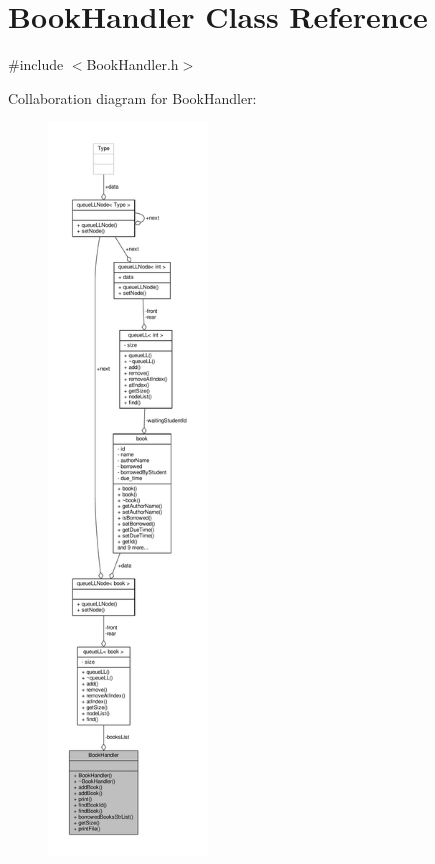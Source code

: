\hypertarget{class_book_handler}{}\section{Book\+Handler Class Reference}
\label{class_book_handler}


{\ttfamily \#include $<$Book\+Handler.\+h$>$}



Collaboration diagram for Book\+Handler\+:
\nopagebreak
\begin{figure}[H]
\begin{center}
\leavevmode
\includegraphics[height=550pt]{class_book_handler__coll__graph}
\end{center}
\end{figure}
